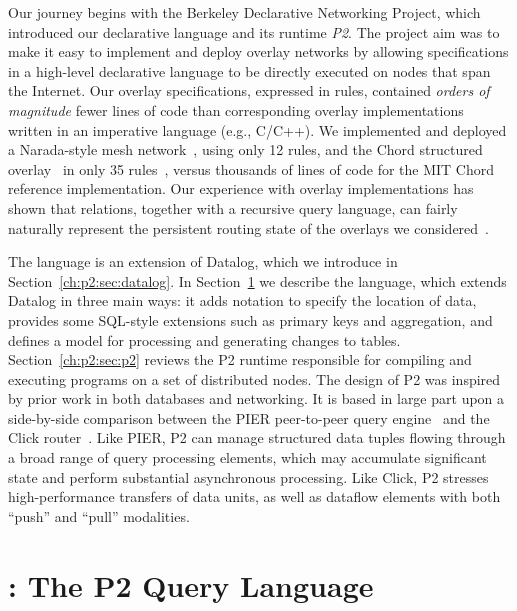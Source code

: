 Our journey begins with the Berkeley Declarative Networking Project,
which introduced our declarative language {\em \OVERLOG} and its runtime {\em
P2}.  The project aim was to make it easy to implement and deploy overlay
networks by allowing specifications in a high-level declarative language to be
directly executed on nodes that span the Internet.  Our overlay specifications,
expressed in \OVERLOG rules, contained {\em orders of magnitude} fewer lines of
code than corresponding overlay implementations written in an imperative
language (e.g., C/C++).  We implemented and deployed a Narada-style mesh
network~\cite{chu00case}, using only 12 rules, and the Chord structured
overlay~\cite{chord} in only 35 rules~\cite{p2:sosp}, versus thousands of lines
of code for the MIT Chord reference implementation.  Our experience with
overlay implementations has shown that relations, together with a recursive
query language, can fairly naturally represent the persistent routing state of
the overlays we considered~\cite{loo-sigmod06, p2:sosp}.

The \OVERLOG language is an extension of Datalog, which we introduce in
Section~\ref{ch:p2:sec:datalog}.  In Section~\ref{ch:p2:sec:overlog} we
describe the \OVERLOG language, which extends Datalog in three main ways: it
adds notation to specify the location of data, provides some SQL-style
extensions such as primary keys and aggregation, and defines a model for
processing and generating changes to tables.  Section~\ref{ch:p2:sec:p2}
reviews the P2 runtime responsible for compiling and executing \OVERLOG
programs on a set of distributed nodes.  The design of P2 was inspired by prior
work in both databases and networking.  It is based in large part upon a
side-by-side comparison between the PIER peer-to-peer query
engine~\cite{pier-cidr05} and the Click router~\cite{click-tocs}.  Like PIER,
P2 can manage structured data tuples flowing through a broad range of query
processing elements, which may accumulate significant state and perform
substantial asynchronous processing.  Like Click, P2 stresses high-performance
transfers of data units, as well as dataflow elements with both ``push'' and
``pull'' modalities.

\section{\OVERLOG: The P2 Query Language}
\label{ch:p2:sec:overlog}

